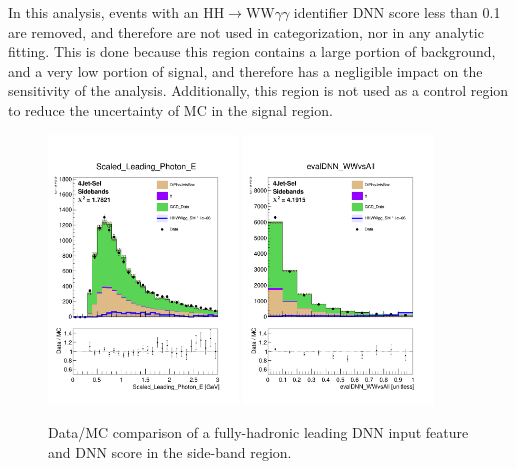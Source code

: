 In this analysis, events with an HH$\rightarrow$WW$\gamma\gamma$ identifier DNN score less than 0.1 
are removed, and therefore are not used in categorization, nor in any analytic fitting. This is done because this region contains a large portion of background, and a very low portion of signal, and therefore has a negligible impact on the sensitivity of the analysis. Additionally,
this region is not used as a control region to reduce the uncertainty of MC in the signal region.


\begin{figure}[!htbp]
  \centering 
  \includegraphics[width=0.45\textwidth]{Images/DataMC/DataMC_Scaled_Leading_Photon_E_SB_nonLog.pdf}%
  \includegraphics[width=0.45\textwidth]{Images/DataMC/DataMC_evalDNN_WWvsAll_SB_nonLog.pdf}%
  \caption{Data/MC comparison of a fully-hadronic leading DNN input feature and DNN score in the side-band region.}
\label{fig:FH_DataMC_1}
\end{figure}
